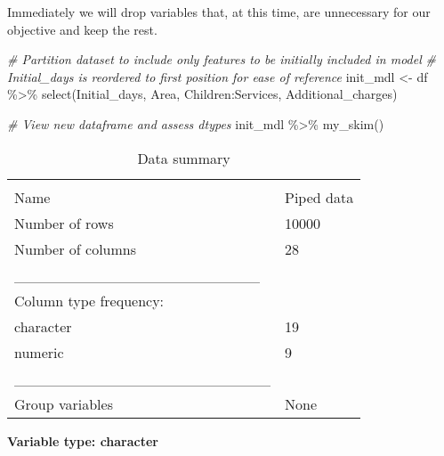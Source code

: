 \documentclass[
]{article}
\newenvironment{Shaded}{\begin{snugshade}}{\end{snugshade}}
\newcommand{\CommentTok}[1]{\textcolor[rgb]{0.56,0.35,0.01}{\textit{#1}}}
\newcommand{\FunctionTok}[1]{\textcolor[rgb]{0.00,0.00,0.00}{#1}}
\newcommand{\NormalTok}[1]{#1}
\newcommand{\OtherTok}[1]{\textcolor[rgb]{0.56,0.35,0.01}{#1}}
\newcommand{\SpecialCharTok}[1]{\textcolor[rgb]{0.00,0.00,0.00}{#1}}
\begin{document}
Immediately we will drop variables that, at this time, are unnecessary
for our objective and keep the rest.

\begin{Shaded}
\begin{Highlighting}[]
\CommentTok{\# Partition dataset to include only features to be initially included in model}
\CommentTok{\# Initial\_days is reordered to first position for ease of reference}
\NormalTok{init\_mdl }\OtherTok{\textless{}{-}}\NormalTok{ df }\SpecialCharTok{\%\textgreater{}\%}
  \FunctionTok{select}\NormalTok{(Initial\_days,}
\NormalTok{         Area,}
\NormalTok{         Children}\SpecialCharTok{:}\NormalTok{Services,}
\NormalTok{         Additional\_charges)}

\CommentTok{\# View new dataframe and assess dtypes}
\NormalTok{init\_mdl }\SpecialCharTok{\%\textgreater{}\%}
  \FunctionTok{my\_skim}\NormalTok{()}
\end{Highlighting}
\end{Shaded}

\begin{longtable}[]{@{}ll@{}}
\caption{Data summary}\tabularnewline
\toprule
& \\
\midrule
\endfirsthead
\toprule
& \\
\midrule
\endhead
Name & Piped data \\
Number of rows & 10000 \\
Number of columns & 28 \\
\_\_\_\_\_\_\_\_\_\_\_\_\_\_\_\_\_\_\_\_\_\_\_ & \\
Column type frequency: & \\
character & 19 \\
numeric & 9 \\
\_\_\_\_\_\_\_\_\_\_\_\_\_\_\_\_\_\_\_\_\_\_\_\_ & \\
Group variables & None \\
\bottomrule
\end{longtable}

\textbf{Variable type: character}
\end{document}
